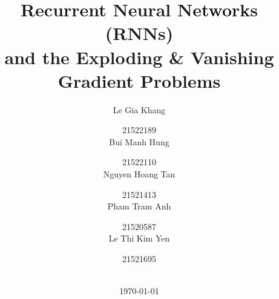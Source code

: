 \documentclass[
	11pt,
]{beamer}
\title[CS115 - Math for Computer Science]{Recurrent Neural Networks (RNNs) \\ and the Exploding \& Vanishing Gradient Problems} %
\author[Nhom 10]{
                    Le Gia Khang \and 21522189 \\
                    Bui Manh Hung \and 21522110 \\
                    Nguyen Hoang Tan \and 21521413 \\
                    Pham Tram Anh \and 21520587 \\
                    Le Thi Kim Yen \and 21521695 \\} %
\institute[UIT]{\fontsize{10}{12}\selectfont \textbf{University of Information Technology} \\ \smallskip \textit{}} %
\date[\today]{ \\ \today} %
\begin{document}
\setcounter{tocdepth}{1}
\begin{frame}
	\titlepage %
\end{frame}


\end{document}
